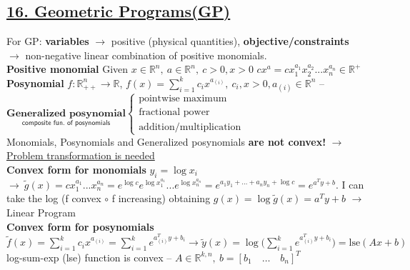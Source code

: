 \documentclass[a4paper]{article}
\begin{document}
\subsection*{\underline{16. Geometric Programs(GP)}}
For GP: \textbf{variables} $\to$ positive (physical quantities), \textbf{objective/constraints} $\to$ non-negative linear combination of positive monomials.\\
\textbf{Positive monomial} Given $x\in\mathbb{R}^n,\ a \in \mathbb{R}^n, \ c>0, x>0$ $cx^a=cx_1^{a_1}x_2^{a_2}...x_n^{a_n}\in\mathbb{R}^+$\\
\textbf{Posynomial} $f:\mathbb{R}^n_{++}\to\mathbb{R}$, $f(x)=\sum_{i=1}^{k}{c_i x^{a_{(i)}}}, \ c_i, x>0, a_{(i)}\in\mathbb{R}^n$ -- $\underset{\textsf{composite fun. of posynomials}}{\textbf{Generalized posynomial}} \begin{cases}
    \text{pointwise maximum}\\
    \text{fractional power}\\
    \text{addition/multiplication}
\end{cases}$\\
Monomials, Posynomials and Generalized posynomials \textbf{are not convex!} $\to$ \underline{Problem transformation is needed}\\
\textbf{Convex form for monomials} $y_i=\log x_i$ $\to \ \tilde{g}(x)=cx_1^{a_1}...x_n^{a_n}=e^{\log c}e^{\log{x_1^{a_1}}}...e^{\log{x_n^{a_n}}}=e^{a_1{y_1}+...+a_n{y_n}+\log{c}}=e^{a^T{y}+b}$. I can take the log (f convex $\circ$ f increasing) obtaining $g(x)=\log{\tilde{g}(x)}=a^T{y}+b$ $\to$ Linear Program\\
\textbf{Convex form for posynomials} $\tilde{f}(x)=\sum_{i=1}^{k}{c_i{x}^{a_{(i)}}}=\sum_{i=1}^{k}{e^{a_{(i)}^T{y}+b_i}}\to
\tilde{y}(x)=\log\bigg({\sum_{i=1}^{k}{e^{a_{(i)}^T{y}+b_i}}}\bigg)=\text{lse}(Ax+b)$\\
log-sum-exp (lse) function is convex -- $A\in\mathbb{R}^{k,n}, \ b = [b_1 \quad \dots \quad b_n]^T$\\
\newpage
\end{document}
